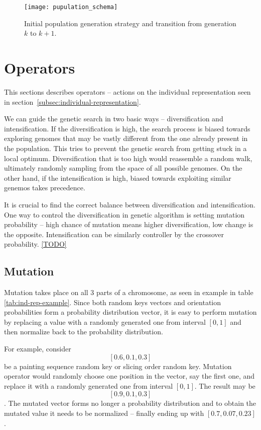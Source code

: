 
\begin{figure}[htp]
    \texttt{[image: pupulation\_schema]}\label{fig:population-schema}
    \caption{Initial population generation strategy and transition from generation $k$ to $k+1$.}
\end{figure}


\section{Operators}\label{sec:operators}
This sections describes operators – actions on the individual representation
seen in section~\ref{subsec:individual-representation}.

We can guide the genetic search in two basic ways – diversification and intensification.
If the diversification is high, the search process is biased towards exploring genomes
that may be vastly different from the one already present in the population.
This tries to prevent the genetic search from getting stuck in a local optimum.
Diversification that is too high would reassemble a random walk, ultimately randomly sampling
from the space of all possible genomes. On the other hand, if the intensification is high,
biased towards exploiting similar genemos takes precedence.

It is crucial to find the correct balance between diversification and intensification.
One way to control the diversification in genetic algorithm is setting
mutation probability – high chance of mutation means higher diversification, low change is the opposite.
Intensification can be similarly controller by the crossover probability.
\ref{TODO}

\subsection{Mutation}\label{subsec:mutation}
Mutation takes place on all 3 parts of a chromosome, as seen in example in table \ref{tab:ind-rep-example}.
Since both random keys vectors and orientation probabilities form a probability distribution vector,
it is easy to perform mutation by replacing a value with a randomly generated one from interval $[0,1]$
and then normalize back to the probability distribution.

For example, consider $$[0.6, 0.1, 0.3]$$ be a painting sequence random key or slicing order random key.
Mutation operator would randomly choose one position in the vector, say the first one, and replace it
with a randomly generated one from interval $[0,1]$. The result may be $$[0.9, 0.1, 0.3]$$.
The mutated vector forms no longer a probability distribution and to obtain the mutated value
it needs to be normalized – finally ending up with $[0.7, 0.07, 0.23]$.

